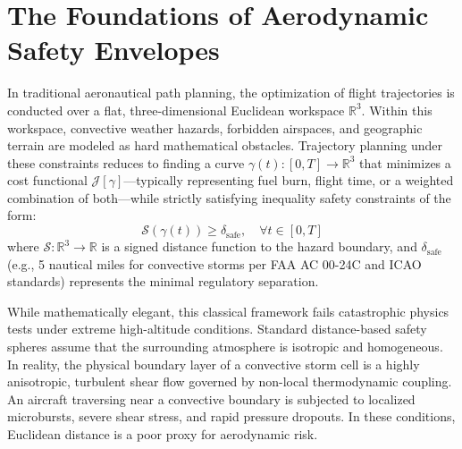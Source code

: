 \documentclass[11pt,a4paper]{book}
\begin{document}
\section{The Foundations of Aerodynamic Safety Envelopes}

In traditional aeronautical path planning, the optimization of flight trajectories is conducted over a flat, three-dimensional Euclidean workspace $\mathbb{R}^3$. Within this workspace, convective weather hazards, forbidden airspaces, and geographic terrain are modeled as hard mathematical obstacles. Trajectory planning under these constraints reduces to finding a curve $\gamma(t): [0, T] \to \mathbb{R}^3$ that minimizes a cost functional $\mathcal{J}[\gamma]$---typically representing fuel burn, flight time, or a weighted combination of both---while strictly satisfying inequality safety constraints of the form:
\begin{equation}
\label{eq:standard_safety}
\mathcal{S}(\gamma(t)) \ge \delta_{\text{safe}}, \quad \forall t \in [0, T]
\end{equation}
where $\mathcal{S}: \mathbb{R}^3 \to \mathbb{R}$ is a signed distance function to the hazard boundary, and $\delta_{\text{safe}}$ (e.g., 5 nautical miles for convective storms per FAA AC 00-24C and ICAO standards) represents the minimal regulatory separation.

While mathematically elegant, this classical framework fails catastrophic physics tests under extreme high-altitude conditions. Standard distance-based safety spheres assume that the surrounding atmosphere is isotropic and homogeneous. In reality, the physical boundary layer of a convective storm cell is a highly anisotropic, turbulent shear flow governed by non-local thermodynamic coupling. An aircraft traversing near a convective boundary is subjected to localized microbursts, severe shear stress, and rapid pressure dropouts. In these conditions, Euclidean distance is a poor proxy for aerodynamic risk.
\end{document}

